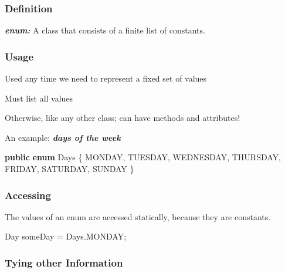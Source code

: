 \documentclass[]{article}
\newenvironment{Shaded}{}{}
\newcommand{\FunctionTok}[1]{\textcolor[rgb]{0.02,0.16,0.49}{#1}}
\newcommand{\KeywordTok}[1]{\textcolor[rgb]{0.00,0.44,0.13}{\textbf{#1}}}
\newcommand{\NormalTok}[1]{#1}
\begin{document}
\hypertarget{definition-2}{%
\subsubsection{Definition}\label{definition-2}}

\textbf{\emph{enum:}} A class that consists of a finite list of
constants.

\hypertarget{usage}{%
\subsubsection{Usage}\label{usage}}

Used any time we need to represent a fixed set of values

Must list all values

Otherwise, like any other class; can have methods and attributes!

An example: \textbf{\emph{days of the week}}

\begin{Shaded}
\begin{Highlighting}[]
\KeywordTok{public} \KeywordTok{enum}\NormalTok{ Days \{}
\NormalTok{    MONDAY,}
\NormalTok{    TUESDAY,}
\NormalTok{    WEDNESDAY,}
\NormalTok{    THURSDAY,}
\NormalTok{    FRIDAY,}
\NormalTok{    SATURDAY,}
\NormalTok{    SUNDAY}
\NormalTok{\}}
\end{Highlighting}
\end{Shaded}

\hypertarget{accessing}{%
\subsubsection{Accessing}\label{accessing}}

The values of an enum are accessed statically, because they are
constants.

\begin{Shaded}
\begin{Highlighting}[]
\NormalTok{Day someDay = Days.}\FunctionTok{MONDAY}\NormalTok{;}
\end{Highlighting}
\end{Shaded}

\hypertarget{tying-other-information}{%
\subsubsection{Tying other Information}\label{tying-other-information}}
\end{document}
